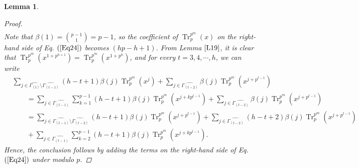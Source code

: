 \documentclass[pdflatex,sn-mathphys-num]{sn-jnl}%
\newtheorem{lemma}{Lemma}
\theoremstyle{thmstyleone}%
\theoremstyle{thmstyletwo}%
\theoremstyle{thmstylethree}%
\begin{document}
\begin{lemma}
\begin{proof}
\begin{align}
        \end{align}
        Note that $\beta(1)=\binom{p-1}{1}=p-1$, so the coefficient of $\operatorname{Tr}_{p}^{p^m}(x)$ on the right-hand side of Eq. $(\ref{Eq24})$ becomes $(hp-h+1)$. From Lemma $\ref{L19}$, it is clear that $\operatorname{Tr}_{p}^{p^m}(x^{1+p^{h+1}})=\operatorname{Tr}_{p}^{p^m}(x^{1+p^h})$, and for every $t=3,4,\cdots,h$, we can write
          \[
\begin{aligned}
&\sum_{j\in\widehat{\Gamma_{(t)}}\setminus\widehat{\Gamma_{(t-1)}}}
   (h-t+1)\beta(j)\operatorname{Tr}_{p}^{p^m}\left(x^{j}\right)
 + \sum_{j\in\widehat{\Gamma_{(t-2)}}}
   \beta(j)\operatorname{Tr}_{p}^{p^{m}}\left(x^{j+p^{t-1}}\right) \\
   &\qquad = \sum_{j\in\widehat{\Gamma_{(t-1)}}}\sum_{k=1}^{p-1}(h-t+1)\beta(j)\operatorname{Tr}_{p}^{p^{m}}\left(x^{j+kp^{t-1}}\right) + \sum_{j\in\widehat{\Gamma_{(t-2)}}}
   \beta(j)\operatorname{Tr}_{p}^{p^{m}}\left(x^{j+p^{t-1}}\right) 
\\ & \qquad =
  \sum_{j\in\widehat{\Gamma_{(t-1)}}\setminus\widehat{\Gamma_{(t-2)}}}
   (h-t+1)\beta(j)\operatorname{Tr}_{p}^{p^m}\left(x^{j+p^{t-1}}\right)
 +\sum_{j\in\widehat{\Gamma_{(t-2)}}}(h-t+2)\beta(j)\operatorname{Tr}_{p}^{p^{m}}\left(x^{j+p^{t-1}}\right)
 \\ &\qquad  
 + \sum_{j\in\widehat{\Gamma_{(t-1)}}}\sum_{k=2}^{p-1}
     (h-t+1)\beta(j)\operatorname{Tr}_{p}^{p^{m}}\left(x^{j+kp^{t-1}}\right). &
\end{aligned}
\]
Hence, the conclusion follows by adding the terms on the right-hand side of Eq. $(\ref{Eq24})$ under modulo $p$.
    \end{proof}
\end{lemma}
\end{document}
